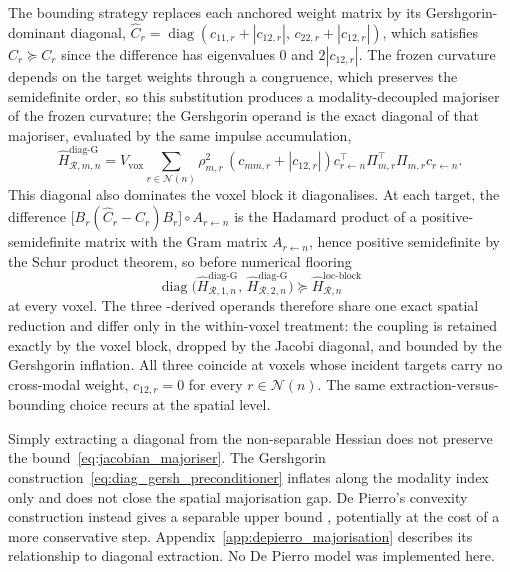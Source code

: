 The bounding strategy replaces each anchored weight matrix by its Gershgorin-dominant diagonal, $\widehat C_r=\operatorname{diag}(c_{11,r}+|c_{12,r}|,\,c_{22,r}+|c_{12,r}|)$, which satisfies $\widehat C_r\succeq C_r$ since the difference has eigenvalues $0$ and $2|c_{12,r}|$. The frozen curvature depends on the target weights through a congruence, which preserves the semidefinite order, so this substitution produces a modality-decoupled majoriser of the frozen curvature; the Gershgorin operand is the exact diagonal of that majoriser, evaluated by the same impulse accumulation,
\begin{equation}
    \widehat H_{\mathcal R,m,n}^{\mathrm{diag\text{-}G}}
    =
    V_{\mathrm{vox}}
    \sum_{r\in\mathcal{N}(n)}
    \rho_{m,r}^{2}\,
    \left(c_{mm,r}+|c_{12,r}|\right)
    c_{r\leftarrow n}^{\top}
    \Pi_{m,r}^{\top}\Pi_{m,r}
    c_{r\leftarrow n}.
    \label{eq:diag_gersh_preconditioner}
\end{equation}
This diagonal also dominates the voxel block it diagonalises. At each target, the difference $\bigl[B_r(\widehat C_r-C_r)B_r\bigr]\circ A_{r\leftarrow n}$ is the Hadamard product of a positive-semidefinite matrix with the Gram matrix $A_{r\leftarrow n}$, hence positive semidefinite by the Schur product theorem, so before numerical flooring
\begin{equation*}
    \operatorname{diag}\bigl(
    \widehat H_{\mathcal R,1,n}^{\mathrm{diag\text{-}G}},\,
    \widehat H_{\mathcal R,2,n}^{\mathrm{diag\text{-}G}}
    \bigr)
    \succeq
    \widehat H_{\mathcal R,n}^{\mathrm{loc\text{-}block}}
\end{equation*}
at every voxel. The three -derived operands therefore share one exact spatial reduction and differ only in the within-voxel treatment: the coupling is retained exactly by the voxel block, dropped by the Jacobi diagonal, and bounded by the Gershgorin inflation. All three coincide at voxels whose incident targets carry no cross-modal weight, $c_{12,r}=0$ for every $r\in\mathcal{N}(n)$. The same extraction-versus-bounding choice recurs at the spatial level.

Simply extracting a diagonal from the non-separable Hessian does not preserve the bound~\eqref{eq:jacobian_majoriser}. The Gershgorin construction~\eqref{eq:diag_gersh_preconditioner} inflates along the modality index only and does not close the spatial majorisation gap. De Pierro's convexity construction instead gives a separable upper bound \cite{depierroModifiedExpectationMaximization1995a}, potentially at the cost of a more conservative step. Appendix~\ref{app:depierro_majorisation} describes its relationship to diagonal extraction. No De Pierro model was implemented here.

